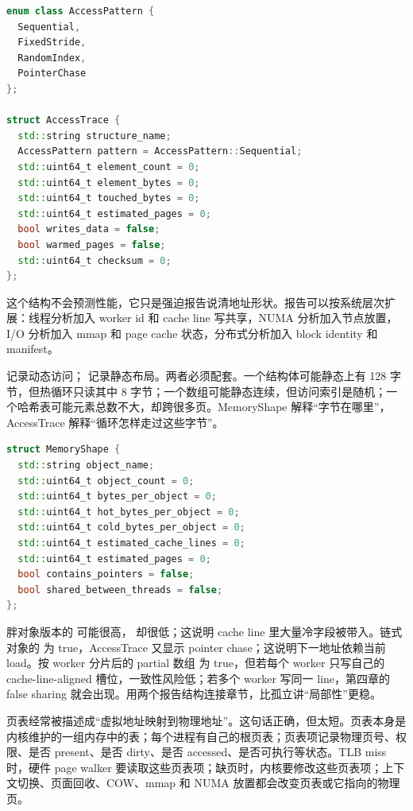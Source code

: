 \begin{lstlisting}[language=C++,caption={AccessTrace 的示例形态}]
enum class AccessPattern {
  Sequential,
  FixedStride,
  RandomIndex,
  PointerChase
};

struct AccessTrace {
  std::string structure_name;
  AccessPattern pattern = AccessPattern::Sequential;
  std::uint64_t element_count = 0;
  std::uint64_t element_bytes = 0;
  std::uint64_t touched_bytes = 0;
  std::uint64_t estimated_pages = 0;
  bool writes_data = false;
  bool warmed_pages = false;
  std::uint64_t checksum = 0;
};
\end{lstlisting}

这个结构不会预测性能，它只是强迫报告说清地址形状。报告可以按系统层次扩展：线程分析加入 worker id 和 cache line 写共享，NUMA 分析加入节点放置，I/O 分析加入 mmap 和 page cache 状态，分布式分析加入 block identity 和 manifest。

 记录动态访问； 记录静态布局。两者必须配套。一个结构体可能静态上有 128 字节，但热循环只读其中 8 字节；一个数组可能静态连续，但访问索引是随机；一个哈希表可能元素总数不大，却跨很多页。MemoryShape 解释“字节在哪里”，AccessTrace 解释“循环怎样走过这些字节”。

\begin{lstlisting}[language=C++,caption={MemoryShape 的示例形态}]
struct MemoryShape {
  std::string object_name;
  std::uint64_t object_count = 0;
  std::uint64_t bytes_per_object = 0;
  std::uint64_t hot_bytes_per_object = 0;
  std::uint64_t cold_bytes_per_object = 0;
  std::uint64_t estimated_cache_lines = 0;
  std::uint64_t estimated_pages = 0;
  bool contains_pointers = false;
  bool shared_between_threads = false;
};
\end{lstlisting}

胖对象版本的  可能很高， 却很低；这说明 cache line 里大量冷字段被带入。链式对象的  为 true，AccessTrace 又显示 pointer chase；这说明下一地址依赖当前 load。按 worker 分片后的 partial 数组  为 true，但若每个 worker 只写自己的 cache-line-aligned 槽位，一致性风险低；若多个 worker 写同一 line，第四章的 false sharing 就会出现。用两个报告结构连接章节，比孤立讲“局部性”更稳。

页表经常被描述成“虚拟地址映射到物理地址”。这句话正确，但太短。页表本身是内核维护的一组内存中的表；每个进程有自己的根页表；页表项记录物理页号、权限、是否 present、是否 dirty、是否 accessed、是否可执行等状态。TLB miss 时，硬件 page walker 要读取这些页表项；缺页时，内核要修改这些页表项；上下文切换、页面回收、COW、mmap 和 NUMA 放置都会改变页表或它指向的物理页。

